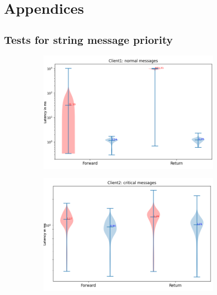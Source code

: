 \chapter{Appendices}\label{chap: append}
\section{Tests for string message priority}\label{chap: append-string-priority}
%
\begin{figure}[h]
    \centering
    \begin{subfigure}[b]{0.6\textwidth}
    \centering
    \includegraphics[width=\textwidth]{figures/appendix/priority_tests/log_violin_2clients_string_priority_client1.png}\hfill 
    \caption{} \label{fig: priority-2clients-string-1}
    \end{subfigure}
    \begin{subfigure}[b]{0.6\textwidth}
        \centering
        \includegraphics[width=\textwidth]{figures/appendix/priority_tests/log_violin_2clients_string_priority_client2.png}\hfill 
        \caption{} \label{fig: priority-2clients-string-2}
    \end{subfigure}
    

\end{figure}
